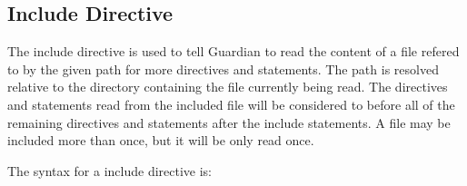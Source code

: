 
\subsection{Include Directive}
{
	The include directive is used to tell Guardian to read the content of
	a file refered to by the given path for more directives and statements.
	The path is resolved
	relative to the directory containing the file currently being read.
	The directives and statements read from the included file will be considered
	to before all of the remaining directives and statements after the
	include statements.
	A file may be included more than once, but it will be only read once.
	
	The syntax for a include directive is:
	\begin{lstlisting}[numbers = none, texcl = true, language = MAIA]
%include: "path/to/file.guard";
	\end{lstlisting}
}
